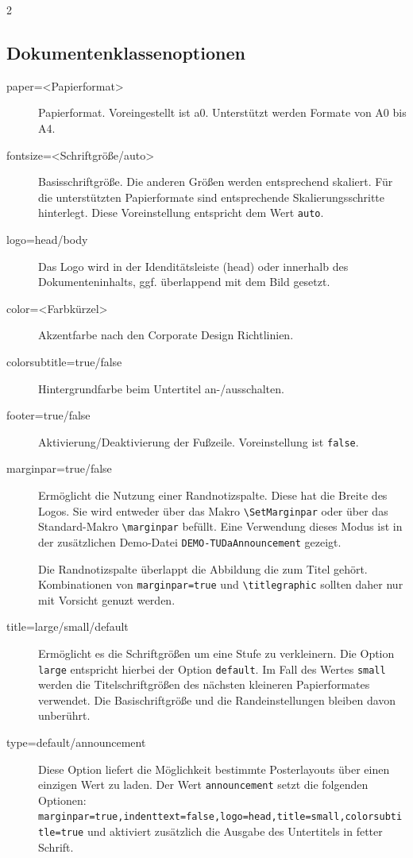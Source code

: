 \documentclass[
	ngerman,%
	paper=a0,%
	accentcolor=9c,%
	logo=body,%
	footer=true,
]{tudaposter}
\newcommand*{\file}[1]{\texttt{#1}}
\newcommand*{\code}[1]{\texttt{#1}}
\let\tbs\textbackslash
\begin{document}
\begin{multicols}{2}
	\subsection*{Dokumentenklassenoptionen}
	\begin{description}
		\item[paper=<Papierformat>] Papierformat. Voreingestellt ist a0. Unterstützt werden Formate von A0 bis A4.
		\item[fontsize=<Schriftgröße/auto>] Basisschriftgröße. Die anderen Größen werden entsprechend skaliert. Für die unterstützten Papierformate sind entsprechende Skalierungsschritte hinterlegt. Diese Voreinstellung entspricht dem Wert \code{auto}.
		\item[logo=head/body] Das Logo wird in der Idenditätsleiste (head) oder innerhalb des Dokumenteninhalts, ggf. überlappend mit dem Bild gesetzt.
		\item[color=<Farbkürzel>] Akzentfarbe nach den Corporate Design Richtlinien.
		\item[colorsubtitle=true/false] Hintergrundfarbe beim Untertitel an-/ausschalten.
		\item[footer=true/false] Aktivierung/Deaktivierung der Fußzeile. Voreinstellung ist \code{false}.
		\item[marginpar=true/false] Ermöglicht die Nutzung einer Randnotizspalte. Diese hat die Breite des Logos. Sie wird entweder über das Makro \code{\tbs{}SetMarginpar} oder über das Standard-Makro \code{\tbs{}marginpar} befüllt. Eine Verwendung dieses Modus ist in der zusätzlichen Demo-Datei \file{DEMO-TUDaAnnouncement} gezeigt.

		      Die Randnotizspalte überlappt die Abbildung die zum Titel gehört. Kombinationen von \code{marginpar=true} und \code{\tbs{}titlegraphic} sollten daher nur mit Vorsicht genuzt werden.
		\item[title=large/small/default] Ermöglicht es die Schriftgrößen um eine Stufe zu verkleinern. Die Option \code{large} entspricht hierbei der Option \code{default}. Im Fall des Wertes \code{small} werden die Titelschriftgrößen des nächsten kleineren Papierformates verwendet. Die Basischriftgröße und die Randeinstellungen bleiben davon unberührt.
		\item[type=default/announcement] Diese Option liefert die Möglichkeit bestimmte Posterlayouts über einen einzigen Wert zu laden.
		      Der Wert \code{announcement} setzt die folgenden Optionen: \code{marginpar=true,indenttext=false,logo=head,title=small,colorsubtitle=true} und aktiviert zusätzlich die Ausgabe des Untertitels in fetter Schrift.
	\end{description}
\end{multicols}
\end{document}
